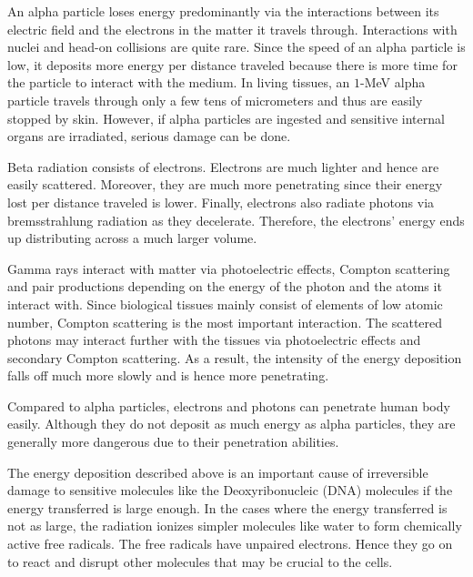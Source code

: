 \documentclass[nofootinbib,preprint,aps]{revtex4-1}
\begin{document}
        An alpha particle loses energy predominantly via the interactions between its electric
        field and the electrons in the matter it travels through. Interactions with nuclei and head-on collisions
        are quite rare. Since the speed of an alpha particle is low, it deposits more energy per distance traveled
        because there is more time for the particle to interact with the medium.
        In living tissues, an $1$-MeV alpha particle travels through only a few tens of micrometers and thus
        are easily stopped by skin. However, if alpha particles are ingested and sensitive internal organs are irradiated,
        serious damage can be done.

        Beta radiation consists of electrons. Electrons are much lighter and hence are easily scattered.
        Moreover, they are much more penetrating since their energy lost per distance traveled is lower.
        Finally, electrons also radiate photons
        via bremsstrahlung radiation as they decelerate. Therefore, the electrons' energy ends up distributing
        across a much larger volume.

        Gamma rays interact with matter via photoelectric effects, Compton scattering and pair productions
        depending on the energy of the photon and the atoms it interact with.
        Since biological tissues mainly consist of elements of low atomic number, Compton
        scattering is the most important interaction. The scattered photons may interact further with the tissues
        via photoelectric effects and secondary Compton scattering. As a result, the intensity of the energy deposition falls
        off much more slowly and is hence more penetrating.
        
        Compared to alpha particles, electrons and photons can penetrate human body easily.
        Although they do not deposit as much energy as alpha particles, they are generally more dangerous due to their
        penetration abilities.

        The energy deposition described above is an important cause of irreversible damage to sensitive molecules
        like the Deoxyribonucleic (DNA) molecules if the energy transferred is large enough.
        In the cases where the energy transferred is not as large, the radiation ionizes simpler molecules like water
        to form chemically active free radicals. The free radicals have unpaired electrons. Hence they go on to react
        and disrupt
        other molecules that may be crucial to the cells.
\end{document}
